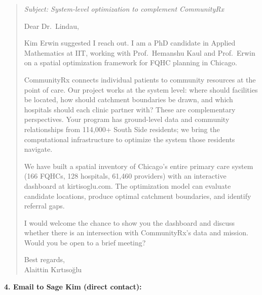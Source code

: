 \documentclass[11pt]{article}
\begin{document}
\begin{quote}
\textit{Subject: System-level optimization to complement CommunityRx}

Dear Dr.\ Lindau,

Kim Erwin suggested I reach out. I am a PhD candidate in Applied Mathematics at IIT, working with Prof.\ Hemanshu Kaul and Prof.\ Erwin on a spatial optimization framework for FQHC planning in Chicago.

CommunityRx connects individual patients to community resources at the point of care. Our project works at the system level: where should facilities be located, how should catchment boundaries be drawn, and which hospitals should each clinic partner with? These are complementary perspectives. Your program has ground-level data and community relationships from 114,000+ South Side residents; we bring the computational infrastructure to optimize the system those residents navigate.

We have built a spatial inventory of Chicago's entire primary care system (166 FQHCs, 128 hospitals, 61,460 providers) with an interactive dashboard at kirtisoglu.com. The optimization model can evaluate candidate locations, produce optimal catchment boundaries, and identify referral gaps.

I would welcome the chance to show you the dashboard and discuss whether there is an intersection with CommunityRx's data and mission. Would you be open to a brief meeting?

Best regards,\\
Alaittin K{\i}rt{\i}so\u{g}lu
\end{quote}

\bigskip

\textbf{4. Email to Sage Kim (direct contact):}
\end{document}
